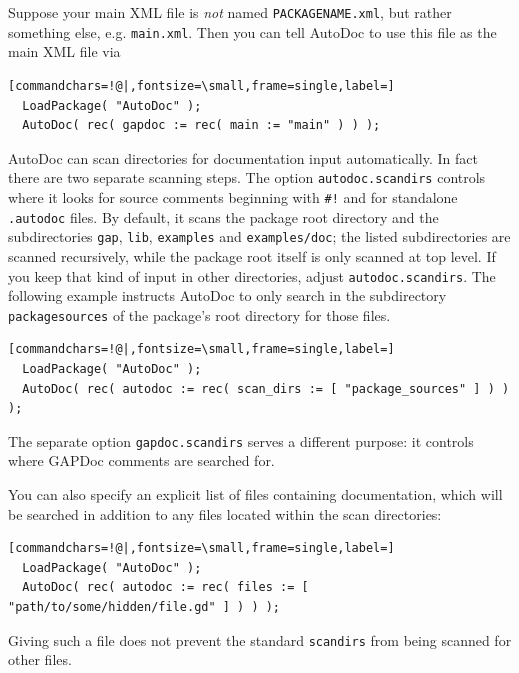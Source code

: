 \documentclass[a4paper,11pt]{report}
\begin{document}
{{{ Suppose your main XML file is \emph{not} named \texttt{PACKAGENAME.xml}, but rather something else, e.g. \texttt{main.xml}. Then you can tell \textsf{AutoDoc} to use this file as the main XML file via 
\begin{Verbatim}[commandchars=!@|,fontsize=\small,frame=single,label=]
  LoadPackage( "AutoDoc" );
  AutoDoc( rec( gapdoc := rec( main := "main" ) ) );
\end{Verbatim}
 

 \textsf{AutoDoc} can scan directories for documentation input automatically. In fact there are
two separate scanning steps. The option \texttt{autodoc.scan{\textunderscore}dirs} controls where it looks for source comments beginning with \texttt{\#!} and for standalone \texttt{.autodoc} files. By default, it scans the package root directory and the subdirectories \texttt{gap}, \texttt{lib}, \texttt{examples} and \texttt{examples/doc}; the listed subdirectories are scanned recursively, while the package root
itself is only scanned at top level. If you keep that kind of input in other
directories, adjust \texttt{autodoc.scan{\textunderscore}dirs}. The following example instructs \textsf{AutoDoc} to only search in the subdirectory \texttt{package{\textunderscore}sources} of the package's root directory for those files. 
\begin{Verbatim}[commandchars=!@|,fontsize=\small,frame=single,label=]
  LoadPackage( "AutoDoc" );
  AutoDoc( rec( autodoc := rec( scan_dirs := [ "package_sources" ] ) ) );
\end{Verbatim}
 The separate option \texttt{gapdoc.scan{\textunderscore}dirs} serves a different purpose: it controls where \textsf{GAPDoc} comments are searched for. 

 You can also specify an explicit list of files containing documentation, which
will be searched in addition to any files located within the scan directories: 
\begin{Verbatim}[commandchars=!@|,fontsize=\small,frame=single,label=]
  LoadPackage( "AutoDoc" );
  AutoDoc( rec( autodoc := rec( files := [ "path/to/some/hidden/file.gd" ] ) ) );
\end{Verbatim}
 Giving such a file does not prevent the standard \texttt{scan{\textunderscore}dirs} from being scanned for other files. 

}}}
\end{document}
